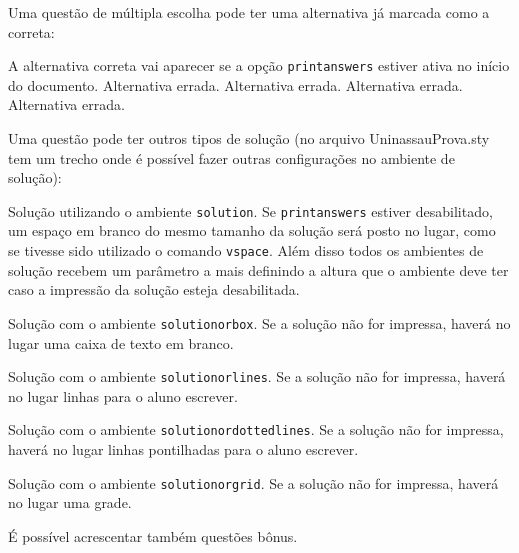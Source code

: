 \documentclass[a4paper, 11pt, addpoints]{exam}
\begin{document}
\begin{questions}
\begin{multicols}{5}
\begin{enumerate}[(A)]
				\end{enumerate}
			\end{multicols}
		\question
		Uma questão de múltipla escolha pode ter uma alternativa já marcada como a correta:
			\begin{choices}
				\justifying
				\CorrectChoice A alternativa correta vai aparecer se a opção \texttt{printanswers} estiver ativa no início do documento.
				\choice Alternativa errada.
				\choice Alternativa errada.
				\choice Alternativa errada.
				\choice Alternativa errada.
			\end{choices}
		\question
		\justifying
		Uma questão pode ter outros tipos de solução (no arquivo UninassauProva.sty tem um trecho onde é possível fazer outras configurações no ambiente de solução):
			\begin{solution}
				\justifying Solução utilizando o ambiente \texttt{solution}. Se \texttt{printanswers} estiver desabilitado, um espaço em branco do mesmo tamanho da solução será posto no lugar, como se tivesse sido utilizado o comando \texttt{vspace}. Além disso todos os ambientes de solução recebem um parâmetro a mais definindo a altura que o ambiente deve ter caso a impressão da solução esteja desabilitada.
			\end{solution}
			\begin{solutionorbox}
				Solução com o ambiente \texttt{solutionorbox}. Se a solução não for impressa, haverá no lugar uma caixa de texto em branco.
			\end{solutionorbox}
			\begin{solutionorlines}
				Solução com o ambiente \texttt{solutionorlines}. Se a solução não for impressa, haverá no lugar linhas para o aluno escrever.
			\end{solutionorlines}
			\begin{solutionordottedlines}
				Solução com o ambiente \texttt{solutionordottedlines}. Se a solução não for impressa, haverá no lugar linhas pontilhadas para o aluno escrever.
			\end{solutionordottedlines}
			\begin{solutionorgrid}
				Solução com o ambiente \texttt{solutionorgrid}. Se a solução não for impressa, haverá no lugar uma grade.
			\end{solutionorgrid}
		\bonusquestion[1]
		É possível acrescentar também questões bônus.
	\end{questions}
	
\end{document}
